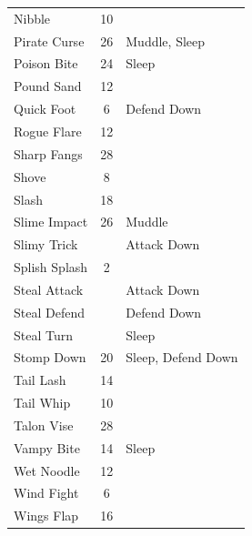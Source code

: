\documentclass[10pt,twocolumn]{memoir}
\begin{document}
\begin{tabular}{l c l}
             Nibble & 10 & \\
             Pirate Curse & 26 & Muddle, Sleep \\
             Poison Bite & 24 & Sleep \\
             Pound Sand & 12 & \\
             Quick Foot & 6 & Defend Down \\
             Rogue Flare & 12 & \\
             Sharp Fangs & 28 & \\
             Shove & 8 & \\
             Slash & 18 & \\
             Slime Impact & 26 & Muddle \\
             Slimy Trick & & Attack Down \\
             Splish Splash & 2 & \\
             Steal Attack & & Attack Down \\
             Steal Defend & & Defend Down \\
             Steal Turn & & Sleep \\
             Stomp Down & 20 & Sleep, Defend Down\\
             Tail Lash & 14 & \\
             Tail Whip & 10 & \\
             Talon Vise & 28 & \\
             Vampy Bite & 14 & Sleep \\
             Wet Noodle & 12 & \\
             Wind Fight & 6 & \\
             Wings Flap & 16 & \\
\end{tabular}
\end{document}
